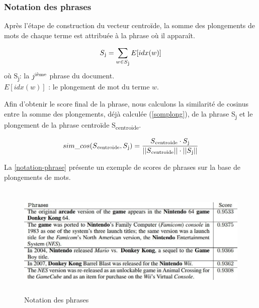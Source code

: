          \subsubsection{Notation des phrases}
         Après l'étape de construction du vecteur centroïde, la somme des plongements de mots de chaque terme  est attribuée à la phrase où il apparaît.\label{somplong}

        \begin{equation*}
         S\textsubscript{j} = \sum_{\substack{w\in S\textsubscript{j}}}
         E[idx(w)]
        \end{equation*}
        où S\textsubscript{j}: la $j\textsuperscript{ième}$ phrase du document. \\ 
        $E[idx(w)]$ : le plongement de mot du terme $w$.

        Afin d'obtenir le score final de la phrase, nous calculons la similarité de cosinus entre la somme des plongements, déjà calculée (\ref{somplong}), de la phrase S\textsubscript{j} et le plongement de la phrase centroïde S\textsubscript{centroide}.
        
        \[sim\_cos(S\textsubscript{centroide},S\textsubscript{j}) = \frac {S\textsubscript{centroide} \cdot S\textsubscript{j}}{||S\textsubscript{centroide}|| \cdot ||S\textsubscript{j}||}\]

        La \autoref{notation-phrase} présente un exemple de scores de phrases sur la base de plongements de mots.
            \begin{figure}[H]
                \centering
                \includegraphics[height=155pt,width=400pt]{img/chapter3/scoreembed.jpg}
                \caption{Notation des phrases \cite{notreresume}}
                \label{notation-phrase}
            \end{figure}

